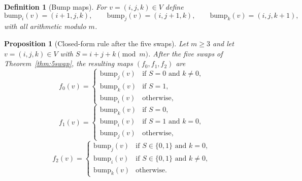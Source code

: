\documentclass[11pt]{article}
\newtheorem{proposition}{Proposition}
\newtheorem{definition}{Definition}
\begin{document}
\begin{definition}[Bump maps]
For $v=(i,j,k)\in V$ define
\[
\mathrm{bump}_i(v)=(i+1,j,k),\qquad
\mathrm{bump}_j(v)=(i,j+1,k),\qquad
\mathrm{bump}_k(v)=(i,j,k+1),
\]
with all arithmetic modulo $m$.
\end{definition}

\begin{proposition}[Closed-form rule after the five swaps]\label{prop:odd-closed}
Let $m\ge 3$ and let $v=(i,j,k)\in V$ with $S=i+j+k\pmod m$.
After the five swaps of Theorem~\ref{thm:5swap}, the resulting maps $(f_0,f_1,f_2)$ are
\[
f_0(v)=
\begin{cases}
\mathrm{bump}_j(v) & \text{if } S=0 \text{ and } k\neq 0,\\
\mathrm{bump}_k(v) & \text{if } S=1,\\
\mathrm{bump}_i(v) & \text{otherwise,}
\end{cases}
\]
\[
f_1(v)=
\begin{cases}
\mathrm{bump}_k(v) & \text{if } S=0,\\
\mathrm{bump}_i(v) & \text{if } S=1 \text{ and } k=0,\\
\mathrm{bump}_j(v) & \text{otherwise,}
\end{cases}
\]
\[
f_2(v)=
\begin{cases}
\mathrm{bump}_j(v) & \text{if } S\in\{0,1\} \text{ and } k=0,\\
\mathrm{bump}_i(v) & \text{if } S\in\{0,1\} \text{ and } k\neq 0,\\
\mathrm{bump}_k(v) & \text{otherwise.}
\end{cases}
\]
\end{proposition}
\end{document}
